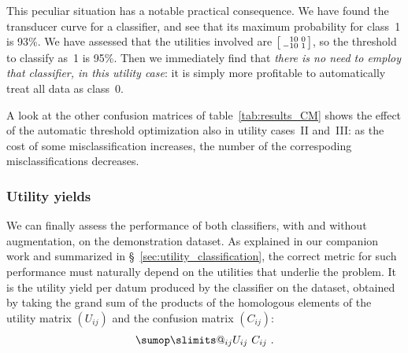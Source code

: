 \documentclass[a4paper,12pt,%
onecolumn,oneside,article,%
british%
]{memoir}
\makeatletter
\def\sum{\DOTSI\sumop\slimits@}
\renewcommand*{\|}[1][]{\nonscript\:#1\vert\nonscript\:\mathopen{}}
\newcommand*{\sect}{\S}%
\newcommand*{\sumatrix}[4]{\begin{bsmallmatrix*}[r]#1&#2\\#3&#4\end{bsmallmatrix*}}
\makeatother
\begin{document}
This peculiar situation has a notable practical consequence. We have found the transducer curve for a classifier, and see that its maximum probability for class~1 is 93\%. We have assessed that the utilities involved are $\sumatrix{10}{0}{-10}{1}$, so the threshold to classify as~1 is 95\%. Then we immediately find that \emph{there is no need to employ that classifier, in this utility case}: it is simply more profitable to automatically treat all data as class~0.

\medskip

A look at the other confusion matrices of table~\ref{tab:results_CM} shows the effect of the automatic threshold optimization also in utility cases~II and~III: as the cost of some misclassification increases, the number of the correspoding misclassifications decreases.


\subsubsection{Utility yields}

We can finally assess the performance of both classifiers, with and without augmentation, on the demonstration dataset. As explained in our companion work \autocites{dyrlandetal2022} and summarized in \sect~\ref{sec:utility_classification}, the correct metric for such performance must naturally depend on the utilities that underlie the problem. It is the utility yield per datum produced by the classifier on the dataset, obtained by taking the grand sum of the products of the homologous elements of the utility matrix $(U_{ij})$ and the confusion matrix $(C_{ij})$:
\begin{equation}
  \label{eq:performance_metric}
  \sum_{ij} U_{ij}\ C_{ij} \ .
\end{equation}




\end{document}

